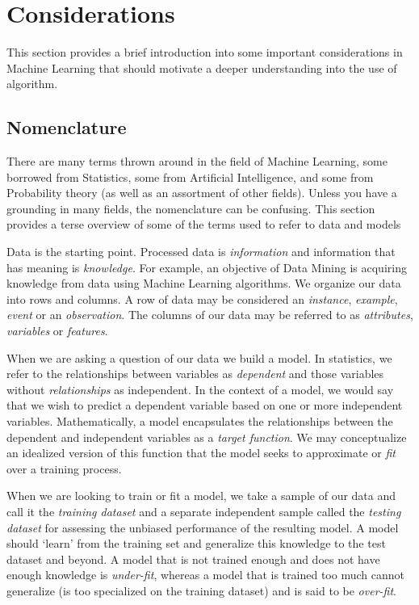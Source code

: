 

\section{Considerations} 
\label{intro:considerations}
This section provides a brief introduction into some important considerations in Machine Learning that should motivate a deeper understanding into the use of algorithm.

\subsection{Nomenclature}
There are many terms thrown around in the field of Machine Learning, some borrowed from Statistics, some from Artificial Intelligence, and some from Probability theory (as well as an assortment of other fields). Unless you have a grounding in many fields, the nomenclature can be confusing. This section provides a terse overview of some of the terms used to refer to data and models

Data is the starting point. Processed data is \emph{information} and information that has meaning is \emph{knowledge}. For example, an objective of Data Mining is acquiring knowledge from data using Machine Learning algorithms. We organize our data into rows and columns. A row of data may be considered an \emph{instance}, \emph{example}, \emph{event} or an \emph{observation}. The columns of our data may be referred to as \emph{attributes}, \emph{variables} or \emph{features}. 

When we are asking a question of our data we build a model. In statistics, we refer to the relationships between variables as \emph{dependent} and those variables without \emph{relationships} as independent. In the context of a model, we would say that we wish to predict a dependent variable based on one or more independent variables. Mathematically, a model encapsulates the relationships between the dependent and independent variables as a \emph{target function}. We may conceptualize an idealized version of this function that the model seeks to approximate or \emph{fit} over a training process. 

When we are looking to train or fit a model, we take a sample of our data and call it the \emph{training dataset} and a separate independent sample called the \emph{testing dataset} for assessing the unbiased performance of the resulting model. A model should `learn' from the training set and generalize this knowledge to the test dataset and beyond. A model that is not trained enough and does not have enough knowledge is \emph{under-fit}, whereas a model that is trained too much cannot generalize (is too specialized on the training dataset) and is said to be \emph{over-fit}.

